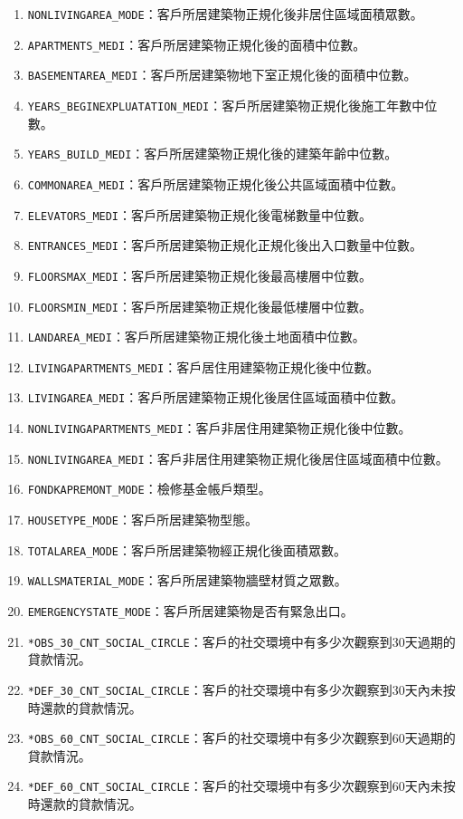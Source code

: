 \documentclass[12pt, a4paper]{article}
\begin{document}
\begin{enumerate}
\item \verb|NONLIVINGAREA_MODE|：客戶所居建築物正規化後非居住區域面積眾數。
\item \verb|APARTMENTS_MEDI|：客戶所居建築物正規化後的面積中位數。
\item \verb|BASEMENTAREA_MEDI|：客戶所居建築物地下室正規化後的面積中位數。
\item \verb|YEARS_BEGINEXPLUATATION_MEDI|：客戶所居建築物正規化後施工年數中位數。
\item \verb|YEARS_BUILD_MEDI|：客戶所居建築物正規化後的建築年齡中位數。
\item \verb|COMMONAREA_MEDI|：客戶所居建築物正規化後公共區域面積中位數。
\item \verb|ELEVATORS_MEDI|：客戶所居建築物正規化後電梯數量中位數。
\item \verb|ENTRANCES_MEDI|：客戶所居建築物正規化正規化後出入口數量中位數。
\item \verb|FLOORSMAX_MEDI|：客戶所居建築物正規化後最高樓層中位數。
\item \verb|FLOORSMIN_MEDI|：客戶所居建築物正規化後最低樓層中位數。
\item \verb|LANDAREA_MEDI|：客戶所居建築物正規化後土地面積中位數。
\item \verb|LIVINGAPARTMENTS_MEDI|：客戶居住用建築物正規化後中位數。
\item \verb|LIVINGAREA_MEDI|：客戶所居建築物正規化後居住區域面積中位數。
\item \verb|NONLIVINGAPARTMENTS_MEDI|：客戶非居住用建築物正規化後中位數。
\item \verb|NONLIVINGAREA_MEDI|：客戶非居住用建築物正規化後居住區域面積中位數。
\item \verb|FONDKAPREMONT_MODE|：檢修基金帳戶類型。
\item \verb|HOUSETYPE_MODE|：客戶所居建築物型態。
\item \verb|TOTALAREA_MODE|：客戶所居建築物經正規化後面積眾數。
\item \verb|WALLSMATERIAL_MODE|：客戶所居建築物牆壁材質之眾數。
\item \verb|EMERGENCYSTATE_MODE|：客戶所居建築物是否有緊急出口。
\item \verb|*OBS_30_CNT_SOCIAL_CIRCLE|：客戶的社交環境中有多少次觀察到30天過期的貸款情況。
\item \verb|*DEF_30_CNT_SOCIAL_CIRCLE|：客戶的社交環境中有多少次觀察到30天內未按時還款的貸款情況。
\item \verb|*OBS_60_CNT_SOCIAL_CIRCLE|：客戶的社交環境中有多少次觀察到60天過期的貸款情況。
\item \verb|*DEF_60_CNT_SOCIAL_CIRCLE|：客戶的社交環境中有多少次觀察到60天內未按時還款的貸款情況。

\end{enumerate}
\end{document}
